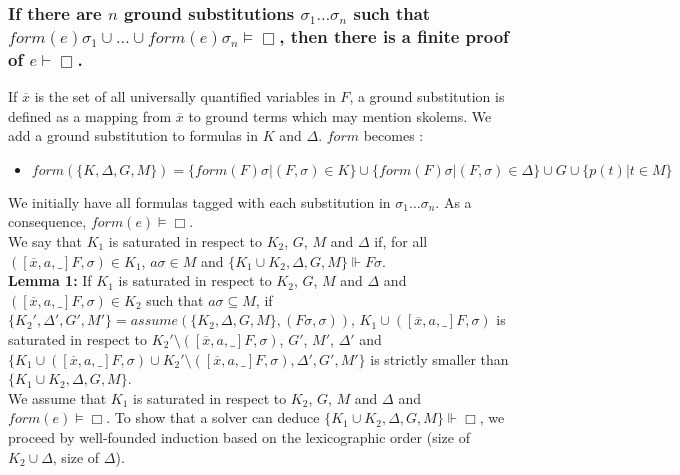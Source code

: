 \documentclass[a4paper,10pt]{report}
\newcommand{\F}{\mathit{form}}
\newcommand{\A}{\mathit{assume}}
\begin{document}
\subsubsection*{If there are $n$ ground substitutions $\sigma_1\dots\sigma_n$ such that
$\F(e)\sigma_1\cup\dots\cup\F(e)\sigma_n\vDash\Box$, then there is a finite proof of $e\vdash\Box$.}
If $\overline x$ is the set of all universally quantified variables in $F$, a ground substitution is
defined as a mapping from $\overline x$ to ground terms which may mention skolems.
We add a ground substitution to formulas in $K$ and $\Delta$. $\F$ becomes :
\begin{itemize}
 \item $\F(\{K,\Delta,G,M\})=\{\F(F)\sigma|(F,\sigma)\in K\}\cup
\{\F(F)\sigma|(F,\sigma)\in\Delta\}\cup G\cup\{p(t)|t\in M\}$
\end{itemize}
We initially have all formulas tagged with each substitution in $\sigma_1\dots\sigma_n$. As a consequence,
$\F(e)\vDash\Box$.\\
We say that $K_1$ is saturated in respect to $K_2$, $G$, $M$ and $\Delta$ if, for all
$([\overline x,a,\_]F,\sigma)\in K_1$, 
$a\sigma\in M$ and $\{K_1\cup K_2,\Delta,G,M\}\Vdash F\sigma$.\\
\textbf{Lemma 1:} If $K_1$ is saturated in respect to $K_2$, $G$, $M$ and $\Delta$ and
$([\overline x,a,\_]F,\sigma)\in K_2$ such that $a\sigma\subseteq M$, if
$\{K_2',\Delta',G',M'\}=\A(\{K_2,\Delta,G,M\},(F\sigma,\sigma))$,
$K_1\cup ([\overline x,a,\_]F,\sigma)$ is saturated in respect to
$K_2'\setminus([\overline x,a,\_]F,\sigma)$, $G'$, $M'$, $\Delta'$ and
$\{K_1\cup ([\overline x,a,\_]F,\sigma)\cup K_2'\setminus([\overline x,a,\_]F,\sigma),\Delta',G',M'\}$
is strictly smaller than $\{K_1\cup K_2,\Delta,G,M\}$.\\
We assume that
$K_1$ is saturated in respect to $K_2$, $G$, $M$ and $\Delta$ and $\F(e)\vDash\Box$.
To show that a solver can deduce $\{K_1\cup K_2,\Delta,G,M\}\Vdash\Box$,
we proceed by well-founded induction based on the lexicographic order (size of $K_2\cup\Delta$,
size of $\Delta$).
\end{document}
